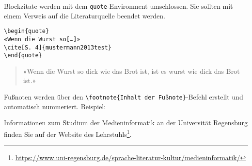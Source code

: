 Blockzitate werden mit dem \verb|quote|-Environment umschlossen.
Sie sollten mit einem Verweis auf die Literaturquelle beendet werden.

\begin{verbatim}
\begin{quote}
«Wenn die Wurst so[…]»
\cite[S. 4]{mustermann2013test}
\end{quote}
\end{verbatim}

\begin{quote}
«Wenn die Wurst so dick wie das Brot ist, ist es wurst wie dick das Brot ist.»
\cite[S. 4]{mustermann2013test}
\end{quote}


Fußnoten werden über den \verb|\footnote{Inhalt der Fußnote}|-Befehl erstellt und automatisch nummeriert. Beispiel:

Informationen zum Studium der Medieninformatik an der Universität Regensburg finden Sie auf der Website des Lehrstuhls\footnote{\url{https://www.uni-regensburg.de/sprache-literatur-kultur/medieninformatik/}}.
